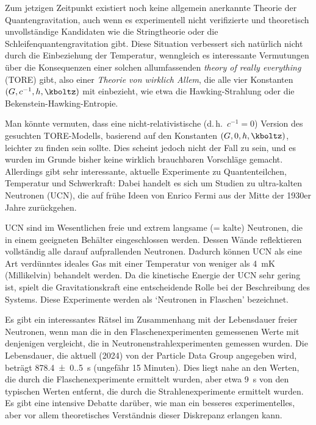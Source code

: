 \documentclass{scrartcl}
\begin{document}
\newpage {}
\label{sec:1011}

Zum jetzigen Zeitpunkt existiert noch keine allgemein anerkannte Theorie der Quantengravitation, auch wenn es experimentell nicht verifizierte und theoretisch unvollständige Kandidaten wie die Stringtheorie oder die Schleifenquantengravitation gibt. Diese Situation verbessert sich natürlich nicht durch die Einbeziehung der Temperatur, wenngleich es interessante Vermutungen über die Konsequenzen einer solchen allumfassenden \emph{theory of really everything} (TORE) gibt, also einer \emph{Theorie von wirklich Allem}, die alle vier Konstanten $(G, c^{-1}, h, \kboltz)$ mit einbezieht, wie etwa die Hawking-Strahlung oder die Bekenstein-Hawking-Entropie.

Man könnte vermuten, dass eine nicht-relativistische (d.\,h.\ $c^{-1}=0$) Version des gesuchten TORE-Modells, basierend auf den Konstanten $(G,0,h,\kboltz)$, leichter zu finden sein sollte. Dies scheint jedoch nicht der Fall zu sein, und es wurden im Grunde bisher keine wirklich brauchbaren Vorschläge gemacht. Allerdings gibt sehr interessante, aktuelle Experimente zu Quantenteilchen, Temperatur und Schwerkraft: Dabei handelt es sich um Studien zu ultra-kalten Neutronen (UCN), die auf frühe Ideen von Enrico Fermi aus der Mitte der 1930er Jahre zurückgehen.

UCN sind im Wesentlichen freie und extrem langsame (= kalte) Neutronen, die in einem geeigneten Behälter eingeschlossen werden. Dessen Wände reflektieren vollständig alle darauf aufprallenden Neutronen. Dadurch können UCN als eine Art verdünntes ideales Gas mit einer Temperatur von weniger als \qty{4}{\milli\kelvin} (Millikelvin) behandelt werden. Da die kinetische Energie der UCN sehr gering ist, spielt die Gravitationskraft eine entscheidende Rolle bei der Beschreibung des Systems. Diese Experimente werden als \enquote*{Neutronen in Flaschen} bezeichnet.

Es gibt ein interessantes Rätsel im Zusammenhang mit der Lebensdauer freier Neutronen, wenn man die in den Flaschenexperimenten gemessenen Werte mit denjenigen vergleicht, die in Neutronenstrahlexperimenten gemessen wurden. Die Lebensdauer, die aktuell (2024) von der Particle Data Group angegeben wird, beträgt \qty{878.4(0.5)}{\second} (ungefähr 15 Minuten). Dies liegt nahe an den Werten, die durch die Flaschenexperimente ermittelt wurden, aber etwa \qty{9}{\second} von den typischen Werten entfernt, die durch die Strahlenexperimente ermittelt wurden. Es gibt eine intensive Debatte darüber, wie man ein besseres experimentelles, aber vor allem theoretisches Verständnis dieser Diskrepanz erlangen kann.
\end{document}
